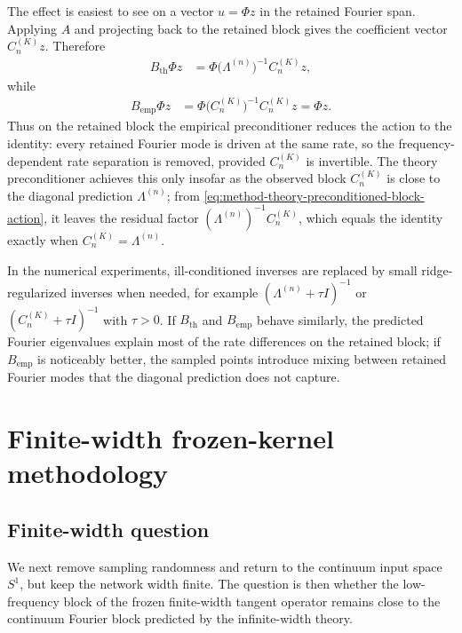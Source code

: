The effect is easiest to see on a vector \(u=\Phi z\) in the retained Fourier
span. Applying \(A\) and projecting back to the retained block gives the
coefficient vector \(C_n^{(K)}z\). Therefore
\begin{align}
	B_{\mathrm{th}}\Phi z
	 & =
	\Phi
	\bigl(\Lambda^{(n)}\bigr)^{-1}
	C_n^{(K)}z,
	\label{eq:method-theory-preconditioned-block-action}
\end{align}
while
\begin{align}
	B_{\mathrm{emp}}\Phi z
	 & =
	\Phi
	\bigl(C_n^{(K)}\bigr)^{-1}
	C_n^{(K)}z
	=
	\Phi z.
	\label{eq:method-empirical-preconditioned-block-action}
\end{align}
Thus on the retained block the empirical preconditioner reduces the action to the
identity: every retained Fourier mode is driven at the same rate, so the
frequency-dependent rate separation is removed, provided \(C_n^{(K)}\) is
invertible. The theory preconditioner achieves this only insofar as the observed
block \(C_n^{(K)}\) is close to the diagonal prediction \(\Lambda^{(n)}\); from
\eqref{eq:method-theory-preconditioned-block-action}, it leaves the residual
factor \((\Lambda^{(n)})^{-1}C_n^{(K)}\), which equals the identity exactly when
\(C_n^{(K)}=\Lambda^{(n)}\).

In the numerical experiments, ill-conditioned inverses are replaced by small
ridge-regularized inverses when needed, for example \((\Lambda^{(n)}+\tau I)^{-1}\)
or \((C_n^{(K)}+\tau I)^{-1}\) with \(\tau>0\). If \(B_{\mathrm{th}}\) and
\(B_{\mathrm{emp}}\) behave similarly, the predicted Fourier eigenvalues explain
most of the rate differences on the retained block; if \(B_{\mathrm{emp}}\) is
noticeably better, the sampled points introduce mixing between retained Fourier
modes that the diagonal prediction does not capture.

\section{Finite-width frozen-kernel methodology}

\subsection{Finite-width question}

We next remove sampling randomness and return to the continuum input space \(S^1\), but keep
the network width finite. The question is then whether the low-frequency block of the frozen
finite-width tangent operator remains close to the continuum Fourier block predicted by the
infinite-width theory.

